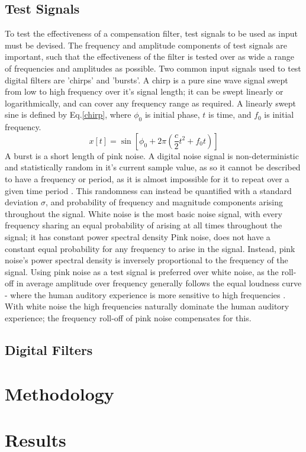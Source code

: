 \documentclass[conference]{IEEEtran}
\begin{document}
    \subsection{Test Signals}
        To test the effectiveness of a compensation filter, test signals to be used as input must be devised.
        The frequency and amplitude components of test signals are important, such that the effectiveness of the filter is tested over as wide a range of frequencies and amplitudes as possible.
        Two common input signals used to test digital filters are 'chirps' and 'bursts'.
        A chirp is a pure sine wave signal swept from low to high frequency over it's signal length; it can be swept linearly or logarithmically, and can cover any frequency range as required.
        A linearly swept sine is defined by Eq.\ref{chirp}, where $\phi_0$ is initial phase, $t$ is time, and $f_0$ is initial frequency.
        \begin{equation}\label{chirp}
            x[t] = \sin{[\phi_0 + 2\pi(\frac{c}{2} t^2 + f_0 t)]}
        \end{equation}
        A burst is a short length of pink noise.
        A digital noise signal is non-deterministic and statistically random in it's current sample value, as so it cannot be described to have a frequency or period, as it is almost impossible for it to repeat over a given time period \cite{OPPENHEIM376}.
        This randomness can instead be quantified with a standard deviation $\sigma$, and probability of frequency and magnitude components arising throughout the signal.
        White noise is the most basic noise signal, with every frequency sharing an equal probability of arising at all times throughout the signal; it has constant power spectral density \cite{CARTER}
        Pink noise, does not have a constant equal probability for any frequency to arise in the signal.
        Instead, pink noise's power spectral density is inversely proportional to the frequency of the signal.
        Using pink noise as a test signal is preferred over white noise, as the roll-off in average amplitude over frequency generally follows the equal loudness curve - where the human auditory experience is more sensitive to high frequencies \cite{GENELEC}.
        With white noise the high frequencies naturally dominate the human auditory experience; the frequency roll-off of pink noise compensates for this.
    \subsection{Digital Filters}
\section{Methodology}

\section{Results}



\end{document}
